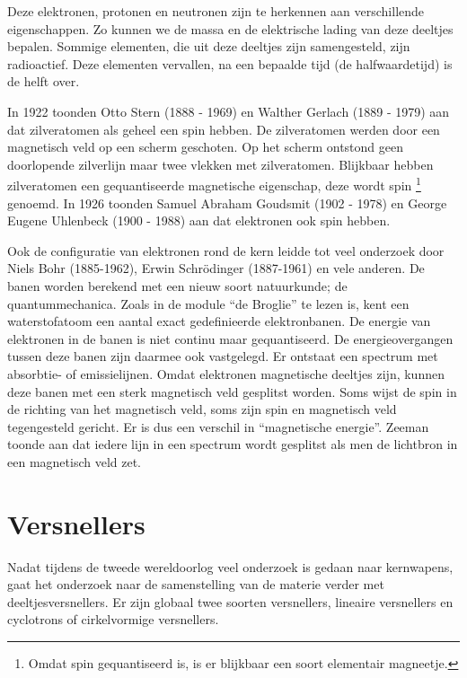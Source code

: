 Deze elektronen, protonen en neutronen zijn te herkennen aan verschillende
eigenschappen. Zo kunnen we de massa en de elektrische lading van
deze deeltjes bepalen. Sommige elementen, die uit deze deeltjes zijn
samengesteld, zijn radioactief. Deze elementen vervallen, na een bepaalde
tijd (de halfwaardetijd) is de helft over.

In 1922 toonden Otto Stern (1888 - 1969) en Walther Gerlach (1889 -
1979) aan dat zilveratomen als geheel een spin hebben. De zilveratomen
werden door een magnetisch veld op een scherm geschoten. Op het scherm
ontstond geen doorlopende zilverlijn maar twee vlekken met zilveratomen.
Blijkbaar hebben zilveratomen een gequantiseerde magnetische eigenschap,
deze wordt spin \footnote{Omdat spin gequantiseerd is, is er blijkbaar
een soort elementair magneetje.} genoemd. In 1926 toonden Samuel Abraham
Goudsmit (1902 - 1978) en George Eugene Uhlenbeck (1900 - 1988) aan dat
elektronen ook spin hebben.

Ook de configuratie van elektronen rond de kern leidde tot veel onderzoek
door Niels Bohr (1885-1962), Erwin Schrödinger (1887-1961) en vele
anderen. De banen worden berekend met een nieuw soort natuurkunde;
de quantummechanica. Zoals in de module ``de Broglie'' te lezen
is, kent een waterstofatoom een aantal exact gedefinieerde elektronbanen.
De energie van elektronen in de banen is niet continu maar gequantiseerd.
De energieovergangen tussen deze banen zijn daarmee ook vastgelegd.
Er ontstaat een spectrum met absorbtie- of emissielijnen. Omdat elektronen
magnetische deeltjes zijn, kunnen deze banen met een sterk magnetisch
veld gesplitst worden. Soms wijst de spin in de richting van het magnetisch
veld, soms zijn spin en magnetisch veld tegengesteld gericht. Er is
dus een verschil in ``magnetische energie''. Zeeman toonde aan dat
iedere lijn in een spectrum wordt gesplitst als men de lichtbron in
een magnetisch veld zet. 


\section{Versnellers}

Nadat tijdens de tweede wereldoorlog veel onderzoek is gedaan naar
kernwapens, gaat het onderzoek naar de samenstelling van de materie
verder met deeltjesversnellers. Er zijn globaal twee soorten versnellers,
lineaire versnellers en cyclotrons of cirkelvormige versnellers.

